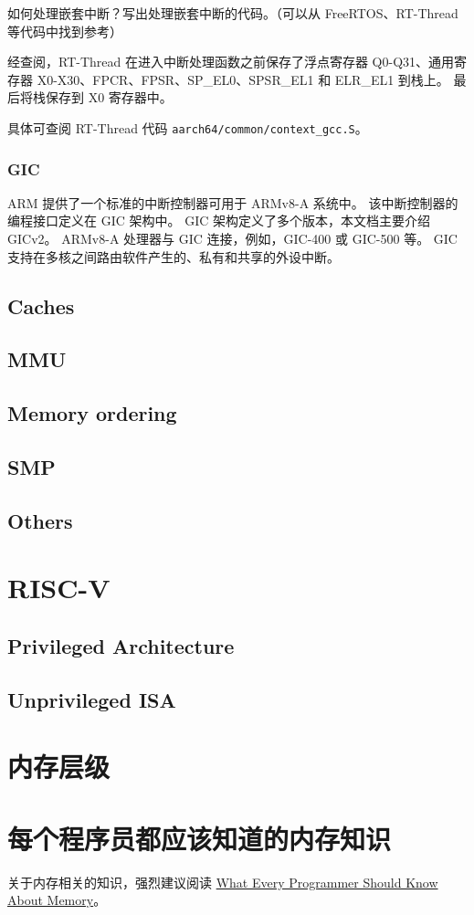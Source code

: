 \begin{probsolu}[title={Problem and Solution \theprob}]{
  如何处理嵌套中断？写出处理嵌套中断的代码。（可以从 FreeRTOS、RT-Thread 等代码中找到参考）
  }\label{pb:how-to-hdl-nest-irqs}

  经查阅，RT-Thread 在进入中断处理函数之前保存了浮点寄存器 Q0-Q31、通用寄存器 X0-X30、FPCR、FPSR、SP\_EL0、SPSR\_EL1 和 ELR\_EL1 到栈上。
  最后将栈保存到 X0 寄存器中。

  具体可查阅 RT-Thread 代码 \lstinline!aarch64/common/context_gcc.S!。
\end{probsolu}

\subsubsection{GIC}

ARM 提供了一个标准的中断控制器可用于 ARMv8-A 系统中。
该中断控制器的编程接口定义在 GIC 架构中。
GIC 架构定义了多个版本，本文档主要介绍 GICv2。
ARMv8-A 处理器与 GIC 连接，例如，GIC-400 或 GIC-500 等。
GIC 支持在多核之间路由软件产生的、私有和共享的外设中断。

\subsection{Caches}

\subsection{MMU}

\subsection{Memory ordering} \label{sec:memory-ordering}

\subsection{SMP}

\subsection{Others}

\section{RISC-V}

\subsection{Privileged Architecture}

\subsection{Unprivileged ISA}

\section{内存层级}

\section{每个程序员都应该知道的内存知识}

关于内存相关的知识，强烈建议阅读
\href{https://people.freebsd.org/~lstewart/articles/cpumemory.pdf}{What Every Programmer Should Know About Memory}。


